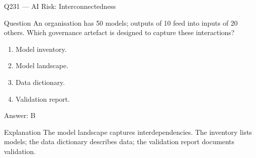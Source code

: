 \documentclass[aspectratio=169,8pt]{beamer}
\begin{document}
																																				
																															
	
																																						
																																						\begin{frame}{Q231 --- AI Risk: Interconnectedness}
																																							\begin{block}{Question}
																																								An organisation has 50 models; outputs of 10 feed into inputs of 20 others. Which governance artefact is designed to capture these interactions?
																																								\begin{enumerate}
																																									\item Model inventory.
																																									\item Model landscape.
																																									\item Data dictionary.
																																									\item Validation report.
																																								\end{enumerate}  \end{block}
																																								\begin{exampleblock}{Answer: B}\end{exampleblock}
																																								\begin{block}{Explanation}
																																									The model landscape captures interdependencies. The inventory lists models; the data dictionary describes data; the validation report documents validation.
																																								\end{block}
																																							\end{frame}
																																					
																																								
																																										
\end{document}
